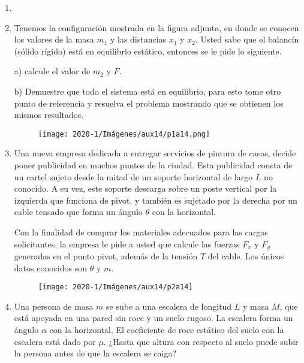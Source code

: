 \documentclass[letterpaper,11pt]{article}
\begin{document}
\vspace{-1cm}
\begin{enumerate}\setlength{\itemsep}{0.4cm}


\item[]

\item Tenemos la configuración mostrada en la figura adjunta, en donde se conocen los valores de la masa $m_1$ y las distancias $x_1$ y $x_2$. Usted sabe que el balancín (sólido rígido) está en equilibrio estático, entonces se le pide lo siguiente.


a) calcule el valor de $m_2$ y $F$.

b) Demuestre que todo el sistema está en equilibrio, para esto tome otro punto de referencia y resuelva el problema mostrando que se obtienen los mismos resultados.
\\

\begin{figure}[h!]
        \centering
        \texttt{[image: 2020-1/Imágenes/aux14/p1a14.png]}
    \end{figure}


\item Una nueva empresa dedicada a entregar servicios de pintura de casas, decide poner publicidad en muchos puntos de la ciudad. Esta publicidad consta de un cartel sujeto desde la mitad de un soporte horizontal de largo $L$ no conocido. A su vez, este soporte descarga sobre un poste vertical por la izquierda que funciona de pivot, y también es sujetado por la derecha por un cable tensado que forma un ángulo $\theta$ con la horizontal.

Con la finalidad de comprar los materiales adecuados para las cargas solicitantes, la empresa le pide a usted que calcule las fuerzas $F_x$ y $F_y$ generadas en el punto pivot, además de la tensión $T$ del cable. Los únicos datos conocidos son  $\theta$ y $m$.
    
   \begin{figure}[h!]
        \centering
        \texttt{[image: 2020-1/Imágenes/aux14/p2a14]}
    \end{figure} 
    
\newpage
    
\item  Una persona de masa $m$ se sube a una escalera de longitud $L$ y masa $M$, que está apoyada en una pared sin roce y un suelo rugoso. La escalera forma un ángulo $\alpha$ con la horizontal. El coeficiente de roce estático del suelo con la escalera está dado por $\mu$. ¿Hasta que altura con respecto al suelo puede subir la persona antes de que la escalera se caiga?\\

        

\end{enumerate}
\end{document}
